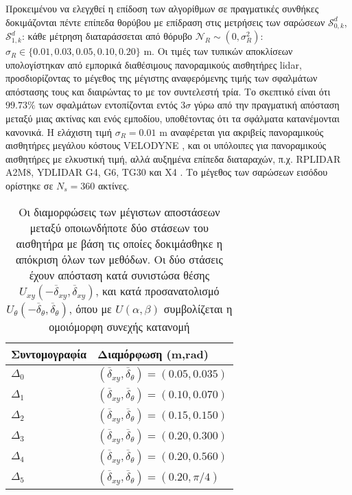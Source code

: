 Προκειμένου να ελεγχθεί η επίδοση των αλγορίθμων σε πραγματικές συνθήκες
δοκιμάζονται πέντε επίπεδα θορύβου με επίδραση στις μετρήσεις των σαρώσεων
$\mathcal{S}_{0,k}^d$, $\mathcal{S}_{1,k}^d$: κάθε μέτρηση διαταράσσεται από
θόρυβο $\mathcal{N}_R \sim (0, \sigma_R^2)$: $\sigma_R \in \{0.01, 0.03,
0.05, 0.10, 0.20\}$ m. Οι τιμές των τυπικών αποκλίσεων υπολογίστηκαν από
εμπορικά διαθέσιμους πανοραμικούς αισθητήρες lidar, προσδιορίζοντας το μέγεθος
της μέγιστης αναφερόμενης τιμής των σφαλμάτων απόστασης τους και διαιρώντας το
με τον συντελεστή τρία. Το σκεπτικό είναι ότι $99.73\%$ των σφαλμάτων
εντοπίζονται εντός $3\sigma$ γύρω από την πραγματική απόσταση μεταξύ μιας
ακτίνας και ενός εμποδίου, υποθέτοντας ότι τα σφάλματα κατανέμονται κανονικά. Η
ελάχιστη τιμή $\sigma_R = 0.01$ m αναφέρεται για ακριβείς πανοραμικούς
αισθητήρες μεγάλου κόστους VELODYNE \cite{velodyne_datasheet}, και οι υπόλοιπες
για πανοραμικούς αισθητήρες με ελκυστική τιμή, αλλά αυξημένα επίπεδα
διαταραχών, π.χ. RPLIDAR A2M8, YDLIDAR G4, G6, TG30 και X4
\cite{a2m8_datasheet,ydlidar}. Το μέγεθος των σαρώσεων εισόδου ορίστηκε σε
$N_s=360$ ακτίνες.
\begin{table}\centering
  \begin{tabular}{ll}
  Συντομογραφία         & Διαμόρφωση (m,rad)                                                      \\  \toprule
  $\Delta_0$            & $(\overline{\delta}_{xy}, \overline{\delta}_{\theta}) = (0.05, 0.035)$  \\
  $\Delta_1$            & $(\overline{\delta}_{xy}, \overline{\delta}_{\theta}) = (0.10, 0.070)$  \\
  $\Delta_2$            & $(\overline{\delta}_{xy}, \overline{\delta}_{\theta}) = (0.15, 0.150)$  \\
  $\Delta_3$            & $(\overline{\delta}_{xy}, \overline{\delta}_{\theta}) = (0.20, 0.300)$  \\
  $\Delta_4$            & $(\overline{\delta}_{xy}, \overline{\delta}_{\theta}) = (0.20, 0.560)$  \\
  $\Delta_5$            & $(\overline{\delta}_{xy}, \overline{\delta}_{\theta}) = (0.20, \pi/4)$  \\  \bottomrule
  \end{tabular}
\caption{\small Οι διαμορφώσεις των μέγιστων αποστάσεων μεταξύ οποιωνδήποτε δύο
         στάσεων του αισθητήρα με βάση τις οποίες δοκιμάσθηκε η απόκριση όλων
         των μεθόδων. Οι δύο στάσεις έχουν απόσταση κατά συνιστώσα θέσης
         $U_{xy}(-\overline{\delta}_{xy}, \overline{\delta}_{xy})$, και
         κατά προσανατολισμό
         $U_{\theta}(-\overline{\delta}_{\theta}, \overline{\delta}_{\theta})$,
         όπου με $U(\alpha,\beta)$ συμβολίζεται η ομοιόμορφη συνεχής κατανομή}
  \label{tbl:02:05_03:deltas}
\end{table}

